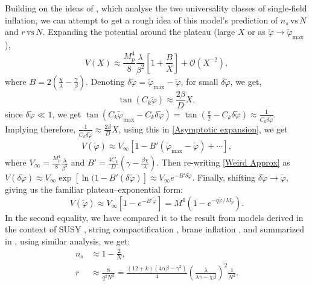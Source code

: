 \documentclass[aps,prd,reprint,preprintnumbers,showpacs,floatfix,nofootinbib,superscript address]{revtex4-2}
\begin{document}
Building on the ideas of \cite{fairbairn_radion_2003, roest_universality_2014}, which analyse the two universality classes of single-field inflation, we can attempt to get a rough idea of this model's prediction of $n_s \, \text{vs} \, N$ and $r \, \text{vs} \, N$.
Expanding the potential around the plateau (large $X$ or as $\tilde{\varphi} \rightarrow \tilde{\varphi}_{\text{max}}$),
\begin{equation} \label{Asymptotic expansion}
    V(X) \approx \frac{M_p^4}{8} \frac{\lambda}{\beta^2}\left[1 + \frac{B}{X}\right] + \mathcal{O}(X^{-2}),
\end{equation}
where $B = 2(\frac{\chi}{\lambda} - \frac{\gamma}{\beta})$. Denoting $\delta \tilde{\varphi} =  \tilde{\varphi}_{\text{max}} - \tilde{\varphi}$, for small $\delta \tilde{\varphi}$, we get,
\begin{equation}
    \tan(C_k \tilde{\varphi}) \approx \frac{2\beta}{D}X,
\end{equation}
since $\delta \tilde{\varphi} \ll 1$, we get $\tan(C_k \tilde{\varphi}_{\text{max}} - C_k\delta\tilde{\varphi}) = \tan(\frac{\pi}{2} - C_k\delta\tilde{\varphi}) \approx \frac{1}{C_k \delta \tilde{\varphi}}$. Implying therefore, 
$
\frac{1}{C_k \delta \tilde{\varphi}} \approx \frac{2\beta}{D}X
$, using this in \cref{Asymptotic expansion}, we get
\begin{align} \label{Weird Approx}
    V(\tilde{\varphi}) \approx V_{\infty}[1 - B'(\tilde{\varphi}_{\text{max}} - \tilde{\varphi}) + \cdots],
\end{align}
where $V_\infty = \frac{M_p^4}{8} \frac{\lambda}{\beta^2}$ and $B' = \frac{4C_k}{D} (\gamma-\frac{\beta\chi}{\lambda})$. Then re-writing \cref{Weird Approx} as $V(\delta\tilde{\varphi}) \approx V_{\infty} \exp{[\ln(1 - B'(\delta \tilde{\varphi})]} \approx V_\infty e^{-B'\delta \tilde{\varphi}}$. Finally, shifting \(\delta\tilde\varphi\to\tilde\varphi\), giving us the familiar plateau–exponential form:
\begin{equation}
    V(\tilde{\varphi}) \approx V_\infty [1 - e^{-B' \tilde{\varphi}} ] = M^4 (1 - e^{-q\tilde{\varphi}/M_p}).
\end{equation}
In the second equality, we have compared it to the result from models derived in the context of SUSY \cite{stewart_inflation_1995}, string compactification \cite{cicoli_fibre_2009}, brane inflation \cite{dvali_brane_1999}, and summarized in \cite{martin_encyclopaedia_2014}, using similar analysis, we get:
\begin{align}
    n_s &\approx 1 - \frac{2}{N}, \\
    r &\approx \frac{8}{q^2N^2} = \frac{(12+k)(4\alpha\beta - \gamma^2)}{4} \left(\frac{\lambda}{\lambda \gamma - \chi \beta} \right)^2 \frac{1}{N^2}.
\end{align}
\end{document}
